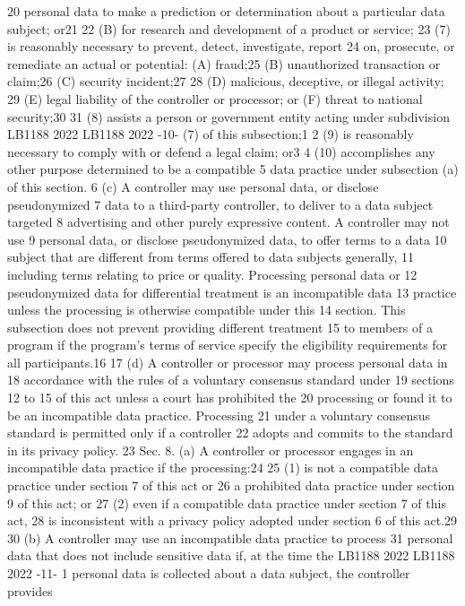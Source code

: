 20 personal data to make a prediction or determination about a particular
data subject; or21
22 (B) for research and development of a product or service;
23 (7) is reasonably necessary to prevent, detect, investigate, report
24 on, prosecute, or remediate an actual or potential:
(A) fraud;25
(B) unauthorized transaction or claim;26
(C) security incident;27
28 (D) malicious, deceptive, or illegal activity;
29 (E) legal liability of the controller or processor; or
(F) threat to national security;30
31 (8) assists a person or government entity acting under subdivision
LB1188
2022
LB1188
2022
-10-
(7) of this subsection;1
2 (9) is reasonably necessary to comply with or defend a legal claim;
or3
4 (10) accomplishes any other purpose determined to be a compatible
5 data practice under subsection (a) of this section.
6 (c) A controller may use personal data, or disclose pseudonymized
7 data to a third-party controller, to deliver to a data subject targeted
8 advertising and other purely expressive content. A controller may not use
9 personal data, or disclose pseudonymized data, to offer terms to a data
10 subject that are different from terms offered to data subjects generally,
11 including terms relating to price or quality. Processing personal data or
12 pseudonymized data for differential treatment is an incompatible data
13 practice unless the processing is otherwise compatible under this
14 section. This subsection does not prevent providing different treatment
15 to members of a program if the program's terms of service specify the
eligibility requirements for all participants.16
17 (d) A controller or processor may process personal data in
18 accordance with the rules of a voluntary consensus standard under
19 sections 12 to 15 of this act unless a court has prohibited the
20 processing or found it to be an incompatible data practice. Processing
21 under a voluntary consensus standard is permitted only if a controller
22 adopts and commits to the standard in its privacy policy.
23 Sec. 8. (a) A controller or processor engages in an incompatible
data practice if the processing:24
25 (1) is not a compatible data practice under section 7 of this act or
26 a prohibited data practice under section 9 of this act; or
27 (2) even if a compatible data practice under section 7 of this act,
28 is inconsistent with a privacy policy adopted under section 6 of this
act.29
30 (b) A controller may use an incompatible data practice to process
31 personal data that does not include sensitive data if, at the time the
LB1188
2022
LB1188
2022
-11-
1 personal data is collected about a data subject, the controller provides
